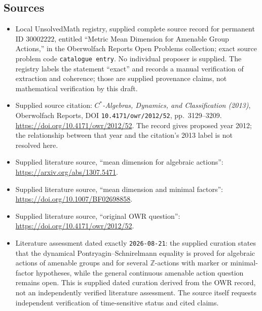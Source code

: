 \documentclass[11pt]{article}
\begin{document}
\subsection{Sources}
\begin{itemize}
\item Local UnsolvedMath registry, supplied complete source record for permanent ID \(30002222\), entitled ``Metric Mean Dimension for Amenable Group Actions,'' in the Oberwolfach Reports Open Problems collection; exact source problem code \texttt{catalogue entry}. No individual proposer is supplied. The registry labels the statement ``exact'' and records a manual verification of extraction and coherence; those are supplied provenance claims, not mathematical verification by this draft.
\item Supplied source citation: \emph{\(C^*\)-Algebras, Dynamics, and Classification (2013)}, Oberwolfach Reports, DOI \texttt{10.4171/owr/2012/52}, pp.~3129--3209. \url{https://doi.org/10.4171/owr/2012/52}. The record gives proposed year 2012; the relationship between that year and the citation's 2013 label is not resolved here.
\item Supplied literature source, ``mean dimension for algebraic actions'': \url{https://arxiv.org/abs/1307.5471}.
\item Supplied literature source, ``mean dimension and minimal factors'': \url{https://doi.org/10.1007/BF02698858}.
\item Supplied literature source, ``original OWR question'': \url{https://doi.org/10.4171/owr/2012/52}.
\item Literature assessment dated exactly \texttt{2026-08-21}: the supplied curation states that the dynamical Pontryagin--Schnirelmann equality is proved for algebraic actions of amenable groups and for several \(\mathbb Z\)-actions with marker or minimal-factor hypotheses, while the general continuous amenable action question remains open. This is supplied dated curation derived from the OWR record, not an independently verified literature assessment. The source itself requests independent verification of time-sensitive status and cited claims.
\end{itemize}
\end{document}
